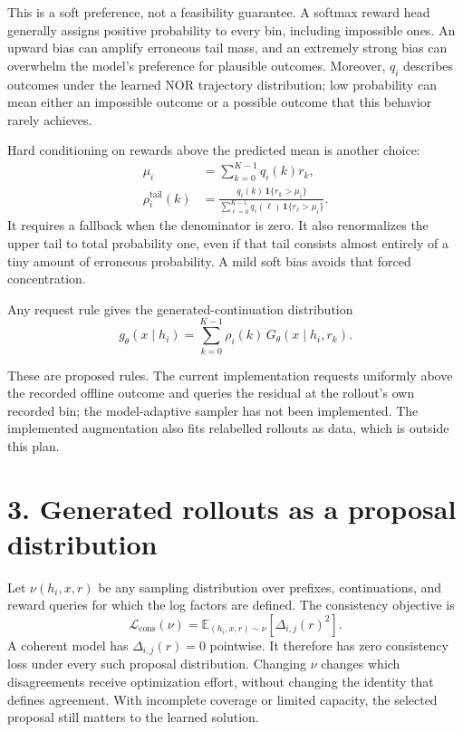 \documentclass{article}
\begin{document}
This is a soft preference, not a feasibility guarantee. A softmax reward head generally assigns positive
probability to every bin, including impossible ones. An upward bias can amplify erroneous tail mass, and
an extremely strong bias can overwhelm the model's preference for plausible outcomes. Moreover, $q_i$
describes outcomes under the learned NOR trajectory distribution; low probability can mean either an
impossible outcome or a possible outcome that this behavior rarely achieves.

Hard conditioning on rewards above the predicted mean is another choice:
\begin{align*}
\mu_i &= \sum_{k=0}^{K-1}q_i(k)r_k, \\
\rho_i^{\mathrm{tail}}(k)
&= \frac{q_i(k)\,\mathbf{1}\{r_k>\mu_i\}}
         {\sum_{\ell=0}^{K-1}q_i(\ell)\,\mathbf{1}\{r_\ell>\mu_i\}}.
\end{align*}
It requires a fallback when the denominator is zero. It also renormalizes the upper tail to total
probability one, even if that tail consists almost entirely of a tiny amount of erroneous probability.
A mild soft bias avoids that forced concentration.

Any request rule gives the generated-continuation distribution
\[
g_\theta(x\mid h_i)
=\sum_{k=0}^{K-1}\rho_i(k)\,G_\theta(x\mid h_i,r_k).
\]

These are proposed rules. The current implementation requests uniformly above the recorded offline outcome
and queries the residual at the rollout's own recorded bin; the model-adaptive sampler has not been
implemented. The implemented augmentation also fits relabelled rollouts as data, which is outside this plan.

\section*{3. Generated rollouts as a proposal distribution}

Let $\nu(h_i,x,r)$ be any sampling distribution over prefixes, continuations, and reward queries for which
the log factors are defined. The consistency objective is
\[
\mathcal L_{\mathrm{cons}}(\nu)
=\mathbb E_{(h_i,x,r)\sim\nu}
  \left[\Delta_{i,j}(r)^2\right].
\]
A coherent model has $\Delta_{i,j}(r)=0$ pointwise. It therefore has zero consistency loss under every
such proposal distribution. Changing $\nu$ changes which disagreements receive optimization effort,
without changing the identity that defines agreement. With incomplete coverage or limited capacity,
the selected proposal still matters to the learned solution.
\end{document}
